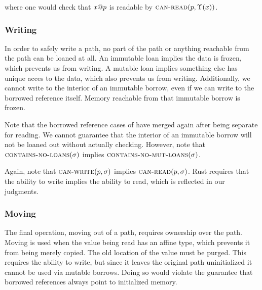 where one would check that ${x}@{p}$ is readable by $\textsc{can-read}({p},{\Upsilon(x)})$.

\subsubsection*{Writing}
In order to safely write a path, no part of the path or anything reachable from the path
can be loaned at all. An immutable loan implies the data is frozen, 
which prevents us from writing. A mutable loan implies something else has unique acces
to the data, which also prevents us from writing.
Additionally, we cannot write to the interior of an immutable borrow, even if we can
write to the borrowed reference itself. Memory reachable from that immutable borrow
is frozen.
\newline

\fbox{$\cnl{\gs}$}


Note that the borrowed reference cases of have merged again after being separate for reading.
We cannot guarantee that the interior of an immutable borrow will not be loaned out without
actually checking. However, note that $\cnl{\gs}$ implies $\textsc{contains-no-mut-loans}({\sigma})$.
\newline



Again, note that $\textsc{can-write}({p},{\sigma})$ implies $\textsc{can-read}({p},{\sigma})$.
Rust requires that the ability to write implies the ability to read, which is
reflected in our judgments.

\subsubsection*{Moving}
The final operation, moving out of a path, requires ownership over the path.
Moving is used when the value being read has an affine type, which prevents it 
from being merely copied. The old location of the value must be purged.
This requires the ability to write, but since it leaves the original path uninitialized
it cannot be used via mutable borrows. Doing so would violate the guarantee that borrowed
references always point to initialized memory.
\newline

